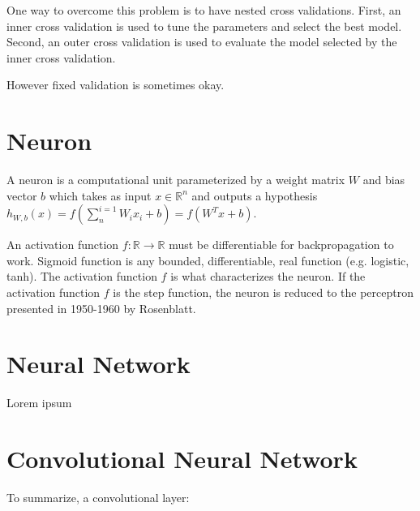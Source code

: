 One way to overcome this problem is to have nested cross validations. First, an inner cross validation is used to tune the parameters and select the best model. Second, an outer cross validation is used to evaluate the model selected by the inner cross validation.

However fixed validation is sometimes okay.

\section{Neuron}

A neuron is a computational unit parameterized by a weight matrix $W$ and bias vector $b$ which takes as input $x \in \mathbb{R}^{n}$ and outputs a hypothesis $h_{W,b}(x) = f(\sum^{i=1}_{n} W_{i}x_{i} + b) = f(W^Tx + b)$.

An activation function $f \colon \mathbb{R} \to \mathbb{R}$ must be differentiable for backpropagation to work. Sigmoid function is any bounded, differentiable, real function (e.g. logistic, tanh).
The activation function $f$ is what characterizes the neuron. If the activation function $f$ is the step function, the neuron is reduced to the perceptron presented in 1950-1960 by Rosenblatt\cite{perceptron}.

\section{Neural Network}

Lorem ipsum

\section{Convolutional Neural Network}

To summarize, a convolutional layer:

